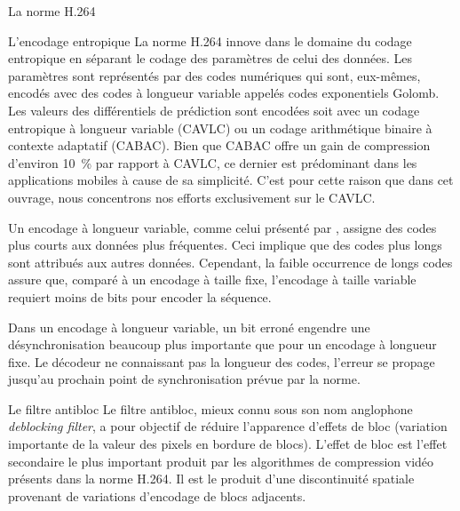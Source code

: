 \begin{chapter}{La norme H.264}
\begin{section}{L'encodage entropique}
La norme H.264 innove dans le domaine du codage entropique en séparant le codage
des paramètres de celui des données. Les paramètres sont représentés par des
codes numériques qui sont, eux-mêmes, encodés avec des codes à longueur variable
appelés codes exponentiels Golomb. Les valeurs des différentiels de prédiction
sont encodées soit avec un codage entropique à longueur variable (CAVLC) ou un
codage arithmétique binaire à contexte adaptatif (CABAC). Bien que CABAC offre
un gain de compression d'environ 10~\% par rapport à CAVLC, ce dernier est
prédominant dans les applications mobiles à cause de sa simplicité. C'est pour
cette raison que dans cet ouvrage, nous concentrons nos efforts exclusivement
sur le CAVLC.

Un encodage à longueur variable, comme celui présenté par \citet{huffman1952},
assigne des codes plus courts aux données plus fréquentes. Ceci implique que des
codes plus longs sont attribués aux autres données. Cependant, la faible
occurrence de longs codes assure que, comparé à un encodage à taille fixe,
l'encodage à taille variable requiert moins de bits pour encoder la séquence.

Dans un encodage à longueur variable, un bit erroné engendre une
désynchronisation beaucoup plus importante que pour un encodage à longueur
fixe. Le décodeur ne connaissant pas la longueur des codes, l'erreur se propage
jusqu'au prochain point de synchronisation prévue par la norme.
\end{section}

\begin{section}{Le filtre antibloc}
Le filtre antibloc, mieux connu sous son nom anglophone \textit{deblocking
filter}, a pour objectif de réduire l'apparence d'effets de bloc (variation
importante de la valeur des pixels en bordure de blocs). L'effet de bloc est
l'effet secondaire le plus important produit par les algorithmes de compression
vidéo présents dans la norme H.264. Il est le produit d'une discontinuité
spatiale provenant de variations d'encodage de blocs adjacents.


\end{section}
\end{chapter}
